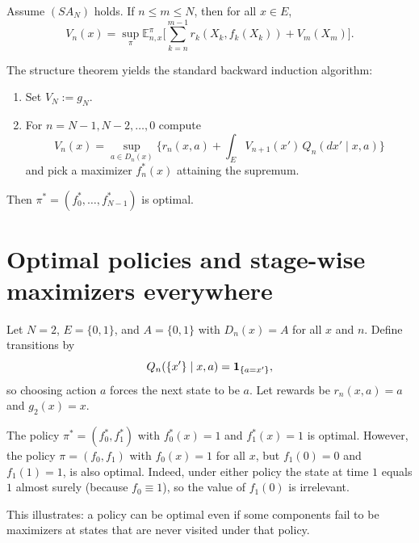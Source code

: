 \begin{corollary}
Assume $(SA_N)$ holds. If $n\le m\le N$, then for all $x\in E$,
\[
V_n(x)=\sup_{\pi}\mathbb{E}_{n,x}^{\pi}\Big[\sum_{k=n}^{m-1} r_k(X_k,f_k(X_k)) + V_m(X_m)\Big].
\]
\end{corollary}

\begin{remark}
The structure theorem yields the standard backward induction algorithm:
\begin{enumerate}[leftmargin=*]
  \item Set $V_N:=g_N$.
  \item For $n=N-1,N-2,\dots,0$ compute
  \[
  V_n(x)=\sup_{a\in D_n(x)}\Big\{r_n(x,a)+\int_E V_{n+1}(x')\,Q_n(dx'\mid x,a)\Big\}
  \]
  and pick a maximizer $f_n^*(x)$ attaining the supremum.
\end{enumerate}
Then $\pi^*=(f_0^*,\dots,f_{N-1}^*)$ is optimal.
\end{remark}

\section{Optimal policies and stage-wise maximizers everywhere}

\begin{example}
Let $N=2$, $E=\{0,1\}$, and $A=\{0,1\}$ with $D_n(x)=A$ for all $x$ and $n$.
Define transitions by
\[
Q_n(\{x'\}\mid x,a)=\mathbf{1}_{\{a=x'\}},
\]
so choosing action $a$ forces the next state to be $a$.
Let rewards be $r_n(x,a)=a$ and $g_2(x)=x$.

The policy $\pi^*=(f_0^*,f_1^*)$ with $f_0^*(x)=1$ and $f_1^*(x)=1$ is optimal.
However, the policy $\pi=(f_0,f_1)$ with $f_0(x)=1$ for all $x$, but $f_1(0)=0$ and $f_1(1)=1$, is also optimal.
Indeed, under either policy the state at time $1$ equals $1$ almost surely (because $f_0\equiv 1$), so the value of $f_1(0)$ is irrelevant.

This illustrates: a policy can be optimal even if some components fail to be maximizers at states that are never visited under that policy.
\end{example}